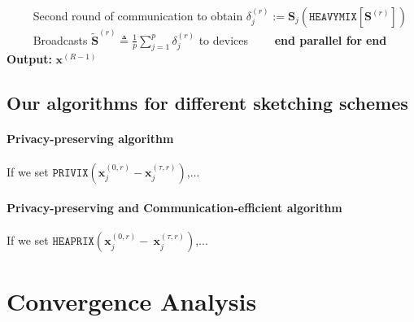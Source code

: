 \begin{algorithm}[H]
\begin{algorithmic}[1]
\State $\qquad$ Second round of communication to obtain $\delta_j^{(r)} :=  \mathbf{S}_j\left(\texttt{HEAVYMIX}[\mathbf{S}^{(r)}]\right)$ 
\State $\qquad$ Broadcasts $\tilde{\mathbf{S}}^{(r)}\triangleq\frac{1}{p}\sum_{j=1}^p\delta_j^{(r)}$ to devices
\State $\qquad$\textbf{end parallel for}
\State \textbf{end}
\State \textbf{Output:} ${\boldsymbol{x}}^{(R-1)}$
\vspace{- 0.1cm}
\end{algorithmic}
\end{algorithm}


\subsection{Our algorithms for different sketching schemes}
\paragraph{Privacy-preserving algorithm}


If we set  $\texttt{PRIVIX}\left(\boldsymbol{x}_j^{(0,r)}-\boldsymbol{x}_j^{(\tau,r)}\right)$,...

\paragraph{Privacy-preserving and Communication-efficient algorithm}
If we set  $\texttt{HEAPRIX}\left(\boldsymbol{x}_j^{(0,r)}-~{\boldsymbol{x}}_{j}^{(\tau,r)}\right)$,...








\section{Convergence Analysis}

